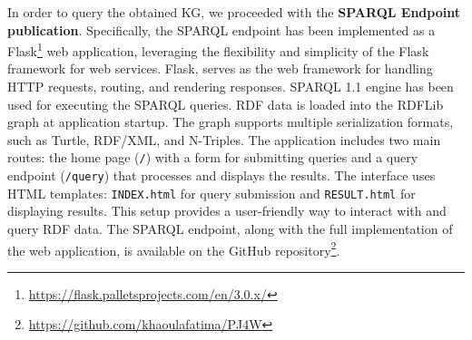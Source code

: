 \documentclass[runningheads]{llncs}
\begin{document}
In order to query the obtained KG, we proceeded with the \textbf{SPARQL Endpoint publication}. Specifically, the SPARQL endpoint has been implemented as a Flask\footnote{\url{https://flask.palletsprojects.com/en/3.0.x/}} web application, leveraging the flexibility and simplicity of the Flask framework for web services. Flask, serves as the web
framework for handling HTTP requests, routing, and rendering responses. SPARQL 1.1 engine has been used for executing the SPARQL queries. %
RDF data is loaded into the RDFLib graph at application startup. The graph supports multiple serialization formats, such as Turtle, RDF/XML, and N-Triples.
The application includes two main routes: the home page (\texttt{/}) with a form for submitting queries and a query endpoint (\texttt{/query}) that processes and displays the results. The interface uses HTML templates: \texttt{INDEX.html} for query submission and \texttt{RESULT.html} for displaying results. This setup provides a user-friendly way to interact with and query RDF data.
The SPARQL endpoint, along with the full implementation of the web application, is available on the GitHub repository\footnote{\url{https://github.com/khaoulafatima/PJ4W}}.
\end{document}
